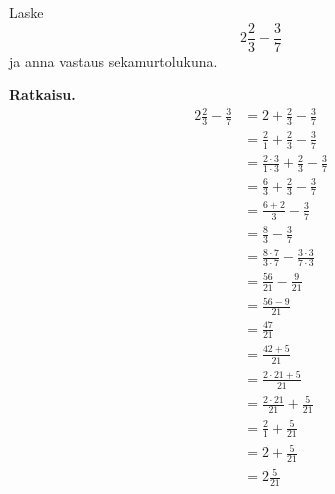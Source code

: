 \newpage
\begin{esimerkki}
        Laske \[2\frac{2}{3} - \frac{3}{7}\] ja anna vastaus sekamurtolukuna.
        
        \textbf{Ratkaisu.}
        \begin{align*}
            2\frac{2}{3} - \frac{3}{7}&=2+\frac{2}{3} - \frac{3}{7}\\
            &=\frac{2}{1}+\frac{2}{3} - \frac{3}{7}\\
            &=\frac{2\cdot3}{1\cdot3}+\frac{2}{3}-\frac{3}{7}\\
            &=\frac{6}{3}+\frac{2}{3}-\frac{3}{7}\\
            &=\frac{6+2}{3} - \frac{3}{7} \\
            &=\frac{8}{3} - \frac{3}{7}\\
            &=\frac{8\cdot7}{3\cdot7} - \frac{3\cdot3}{7\cdot3}\\
            &=\frac{56}{21} - \frac{9}{21}\\
            &=\frac{56-9}{21}\\
            &=\frac{47}{21}\\
            &=\frac{42+5}{21}\\ 
            &=\frac{2\cdot21+5}{21}\\ %
            &=\frac{2\cdot21}{21}+\frac{5}{21}\\ %
            &=\frac{2}{1}+\frac{5}{21}\\
            &=2+\frac{5}{21}\\
            &=2\frac{5}{21}\\
        \end{align*}
    \end{esimerkki}

